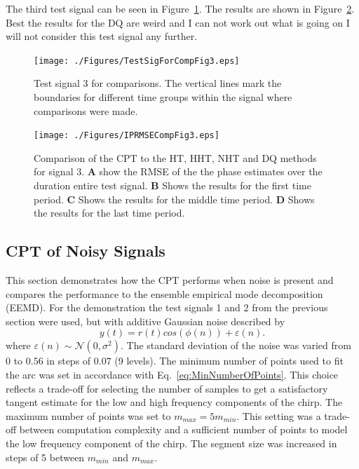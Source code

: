 \documentclass[journal,11pt,a4paper,onecolumn,draftcls]{IEEEtran}
\begin{document}
The third test signal can be seen in Figure~\ref{fig:TestSig3}. The results are shown in Figure~\ref{fig:ResultsTestSig3}. Best the results for the DQ are weird and I can not work out what is going on I will not consider this test signal any further.
\begin{figure}[!ht]
	\centering
		\texttt{[image: ./Figures/TestSigForCompFig3.eps]}
	\caption{Test signal 3 for comparisons. The vertical lines mark the boundaries for different time groups within the signal where comparisons were made. }
	\label{fig:TestSig3}
\end{figure}

\begin{figure}[!ht]
	\centering
		\texttt{[image: ./Figures/IPRMSECompFig3.eps]}
	\caption{Comparison of the CPT to the HT, HHT, NHT and DQ methods for signal 3. \textbf{A} show the RMSE of the the phase estimates over the duration entire test signal. \textbf{B} Shows the results for the first time period. \textbf{C} Shows the results for the middle time period. \textbf{D} Shows the results for the last time period.}
	\label{fig:ResultsTestSig3}
\end{figure}

\subsection{CPT of Noisy Signals}\label{sect:NoisySignalsSection}
This section demonstrates how the CPT performs when noise is present and compares the performance to the ensemble empirical mode decomposition (EEMD). For the demonstration the test signals 1 and 2 from the previous section were used, but with additive Gaussian noise described by
\begin{equation}
    y(t)=r\left(t\right)cos\left(\phi\left(n\right)\right) + \varepsilon \left( n \right).
\end{equation}
where $\varepsilon(n) \sim \mathcal{N}(0,\sigma^2)$. The standard deviation of the noise was varied from $0$ to $0.56$ in steps of $0.07$ (9 levels). The minimum number of points used to fit the arc was set in accordance with Eq.~\ref{eq:MinNumberOfPoints}. This choice reflects a trade-off for selecting the number of samples to get a satisfactory tangent estimate for the low and high frequency components of the chirp. The maximum number of points was set to $m_{max} = 5m_{min}$. This setting was a trade-off between computation complexity and a sufficient number of points to model the low frequency component of the chirp. The segment size was increased in steps of 5 between $m_{min}$ and $m_{max}$.
\end{document}
